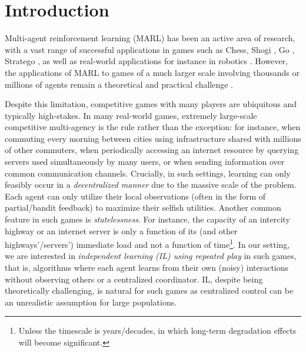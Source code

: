 
\section{Introduction}

Multi-agent reinforcement learning (MARL) has been an active area of research, with a vast range of successful applications in games such as Chess, Shogi \citep{silver2017mastering}, Go \citep{silver2018general}, Stratego \citep{perolat2022mastering}, as well as real-world applications for instance in robotics \citep{matignon2007hysteretic}.
However, the applications of MARL to games of a much larger scale involving thousands or millions of agents remain a theoretical and practical challenge \citep{wang2020breaking}.

Despite this limitation, competitive games with many players are ubiquitous and typically high-stakes.
In many real-world games, extremely large-scale competitive multi-agency is the rule rather than the exception: for instance, when commuting every morning between cities using infrastructure shared with millions of other commuters,
when periodically accessing an internet resource by querying servers used simultaneously by many users,
or when sending information over common communication channels.
Crucially, in such settings, learning can only feasibly occur in a \emph{decentralized manner} due to the massive scale of the problem. 
Each agent can only utilize their local observations (often in the form of partial/bandit feedback) to maximize their selfish utilities.
Another common feature in such games is \emph{statelessness}.
For instance, the capacity of an intercity highway or an internet server is only a function of its (and other highways'/servers') immediate load and not a function of time\footnote{Unless the timescale is years/decades, in which long-term degradation effects will become significant.}.
In our setting, we are interested in \emph{independent learning (IL) using repeated play} in such games, that is, algorithms where each agent learns from their own (noisy) interactions without observing others or a centralized coordinator.
IL, despite being theoretically challenging, is natural for such games as centralized control can be an unrealistic assumption for large populations.








